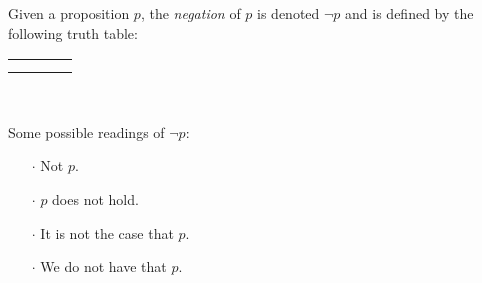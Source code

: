 \begin{definition}[Negation]
    \begin{center}
        \begin{minipage}[t]{.55\linewidth}
            Given a proposition \(p\), the \emph{negation} of \(p\)
            is denoted \(\neg p\) and is defined by the following truth table:
            \begin{table}[H]
                \centering
                \label{tab:not}
                \begin{tabular}{|Cc||Cc|}
                    \hline
                     &  \\ \hline
                    \thead{\(\top\)} &  \\
                    \thead{\(\bot\)} &  \\ \hline
                \end{tabular}
            \end{table}
        \end{minipage}%
        \begin{minipage}[t]{.05\linewidth}
            ~
        \end{minipage}%
        \begin{minipage}[t]{.4\linewidth}
            Some possible readings of \(\neg p\):\\
            \begin{itemize}
                \item[\(\cdot\)]
                    Not \(p\).
                \item[\(\cdot\)]
                    \(p\) does not hold.
                \item[\(\cdot\)]
                    It is not the case that \(p\).
                \item[\(\cdot\)]
                    We do not have that \(p\).
            \end{itemize}
        \end{minipage}
    \end{center}
\end{definition}

